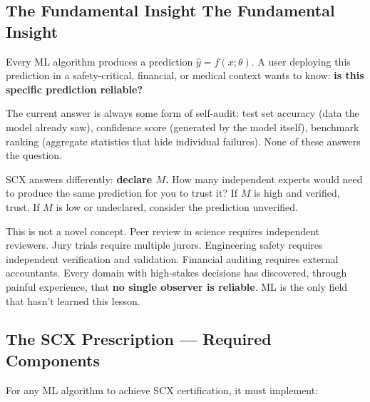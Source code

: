 \documentclass[12pt,a4paper]{article}
\theoremstyle{definition}
\newcommand{\SCX}{\textsc{SCX}}
\begin{document}
\subsection{The Fundamental Insight The Fundamental Insight}

Every ML algorithm produces a prediction $\hat{y} = f(x; \theta)$. A user deploying this prediction in a safety-critical, financial, or medical context wants to know: \textbf{is this specific prediction reliable?}

The current answer is always some form of self-audit: test set accuracy (data the model already saw), confidence score (generated by the model itself), benchmark ranking (aggregate statistics that hide individual failures). None of these answers the question.

\SCX{} answers differently: \textbf{declare $M$.} How many independent experts would need to produce the same prediction for you to trust it? If $M$ is high and verified, trust. If $M$ is low or undeclared, consider the prediction unverified.

This is not a novel concept. Peer review in science requires independent reviewers. Jury trials require multiple jurors. Engineering safety requires independent verification and validation. Financial auditing requires external accountants. Every domain with high-stakes decisions has discovered, through painful experience, that \textbf{no single observer is reliable}. ML is the only field that hasn't learned this lesson.

\subsection{The SCX Prescription — Required Components}

For any ML algorithm to achieve \SCX{} certification, it must implement:
\end{document}
